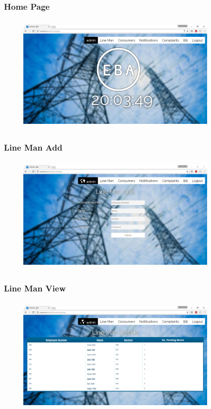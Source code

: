 \documentclass{beamer} %
\theoremstyle{definition} %
\begin{document}
\begin{frame}
\frametitle{Home Page}
\begin{figure}[center]
\includegraphics[width=10cm ,height=5.9cm]{loggedin.png} 
\end{figure}
\end{frame}

\begin{frame}
\frametitle{Line Man Add}
\begin{figure}[center]
\includegraphics[width=10cm ,height=5.9cm]{linemanadd.png} 
\end{figure}
\end{frame}

\begin{frame}
\frametitle{Line Man View}
\begin{figure}[center]
\includegraphics[width=10cm ,height=5.9cm]{linemanview.png} 
\end{figure}
\end{frame}
\end{document}

